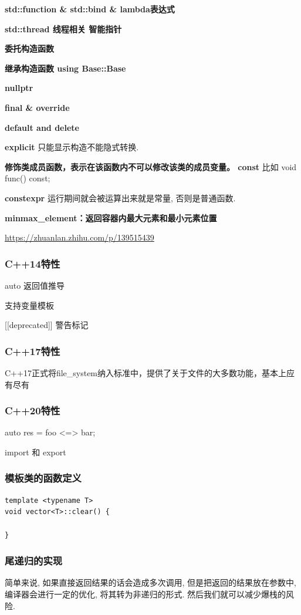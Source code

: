 \documentclass[UTF8]{ctexart}
\begin{document}
\textbf{std::function \& std::bind \& lambda表达式}

\textbf{std::thread 线程相关 智能指针}


\textbf{委托构造函数}

\textbf{继承构造函数 using Base::Base}

\textbf{nullptr}

\textbf{final \& override}

\textbf{default and delete}

\textbf{explicit} 只能显示构造不能隐式转换.

\textbf{修饰类成员函数，表示在该函数内不可以修改该类的成员变量。 const } 比如  void func() const;

\textbf{constexpr } 运行期间就会被运算出来就是常量, 否则是普通函数.

\textbf{minmax\_element：返回容器内最大元素和最小元素位置}

\url{https://zhuanlan.zhihu.com/p/139515439}

\subsubsection{C++14特性}

auto 返回值推导

支持变量模板

[[deprecated]] 警告标记

\subsubsection{C++17特性}

C++17正式将file\_system纳入标准中，提供了关于文件的大多数功能，基本上应有尽有

\subsubsection{C++20特性}

auto res = foo <=> bar;

import 和 export

\subsubsection{模板类的函数定义}
\begin{lstlisting}
template <typename T>
void vector<T>::clear() {
	
}
\end{lstlisting}
\subsubsection{尾递归的实现}
简单来说, 如果直接返回结果的话会造成多次调用, 但是把返回的结果放在参数中, 编译器会进行一定的优化, 将其转为非递归的形式. 然后我们就可以减少爆栈的风险.
\end{document}

